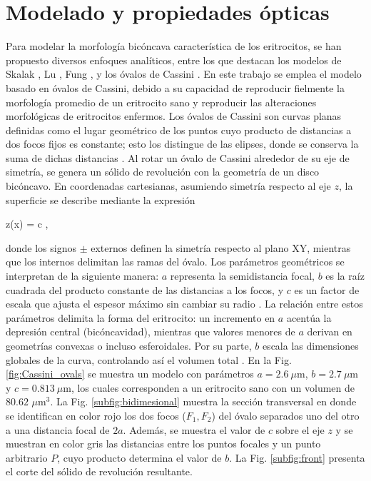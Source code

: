 \section{Modelado y propiedades ópticas}
\label{section:optical_properties}

%
%

Para modelar la morfología bicóncava característica de los eritrocitos, se han propuesto diversos enfoques analíticos, entre los que destacan los modelos de Skalak \cite{skalakStrainEnergyFunction1973}, Lu \cite{luSimulationsLightScattering2005}, Fung \cite{fungHighresolutionDataGeometry1981},
 y los óvalos de Cassini \cite{ereminaDifferentShapeModels2006}. En este trabajo se emplea el modelo basado en óvalos de Cassini, debido a su capacidad de reproducir fielmente la morfología promedio de un eritrocito sano y reproducir las alteraciones morfológicas de eritrocitos enfermos. Los óvalos de Cassini son curvas planas definidas como el lugar geométrico de los puntos cuyo producto de distancias a dos focos fijos es constante; esto los distingue de las elipses, donde se conserva la suma de dichas distancias \cite{wriedtLightScatteringSingle2006}. Al rotar un óvalo de Cassini alrededor de su eje de simetría, se genera un sólido de revolución con la geometría de un disco bicóncavo. En coordenadas cartesianas, asumiendo simetría respecto al eje $z$, la superficie se describe mediante la expresión \cite{ereminaDifferentShapeModels2006}
 \begin{tcolorbox}
 	z(x) = \pm c ,
 	\label{eq:cassini}
 \end{tcolorbox}
\noindent donde los signos $\pm$ externos definen la simetría respecto al plano XY, mientras que los internos delimitan las ramas del óvalo. Los parámetros geométricos se interpretan de la siguiente manera: $a$ representa la semidistancia focal, $b$ es la raíz cuadrada del producto constante de las distancias a los focos, y $c$ es un factor de escala que ajusta el espesor máximo sin cambiar su radio \cite{wriedtLightScatteringSingle2006}. La relación entre estos parámetros delimita la forma del eritrocito: un incremento en $a$ acentúa la depresión central (bicóncavidad), mientras que valores menores de $a$ derivan en geometrías convexas o incluso esferoidales. Por su parte, $b$ escala las dimensiones globales de la curva, controlando así el volumen total \cite{ereminaDifferentShapeModels2006}. En la Fig. \ref{fig:Cassini_ovals} se muestra un modelo con parámetros $a=2.6~\mu$m, $b=2.7~\mu$m y $c=0.813~\mu$m, los cuales corresponden a un eritrocito sano con un volumen de $80.62$ $\mu$m$^3$. La Fig. \ref{subfig:bidimesional} muestra la sección transversal en donde se identifican en color rojo los dos focos ($F_1,F_2$) del óvalo separados uno del otro a una distancia focal de $2a$. Además, se muestra el valor de $c$ sobre el eje $z$ y se muestran en color gris las distancias entre los puntos focales y un punto arbitrario $P$, cuyo producto determina el valor de $b$. La Fig. \ref{subfig:front} presenta el corte del sólido de revolución resultante.
